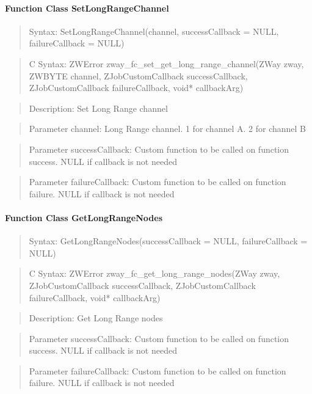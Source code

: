 \paragraph{Function Class SetLongRangeChannel}
\begin{quote}Syntax: SetLongRangeChannel(channel, successCallback = NULL, failureCallback = NULL)\end{quote}
\begin{quote}C Syntax: ZWError zway\_fc\_set\_get\_long\_range\_channel(ZWay zway, ZWBYTE channel, ZJobCustomCallback successCallback, ZJobCustomCallback failureCallback, void* callbackArg)\end{quote}
\begin{quote}Description: Set Long Range channel\end{quote}
\begin{quote}Parameter channel: Long Range channel. 1 for channel A. 2 for channel B\end{quote}
\begin{quote}Parameter successCallback: Custom function to be called on function success. NULL if callback is not needed\end{quote}
\begin{quote}Parameter failureCallback: Custom function to be called on function failure. NULL if callback is not needed\end{quote}


\paragraph{Function Class GetLongRangeNodes}
\begin{quote}Syntax: GetLongRangeNodes(successCallback = NULL, failureCallback = NULL)\end{quote}
\begin{quote}C Syntax: ZWError zway\_fc\_get\_long\_range\_nodes(ZWay zway, ZJobCustomCallback successCallback, ZJobCustomCallback failureCallback, void* callbackArg)\end{quote}
\begin{quote}Description: Get Long Range nodes\end{quote}
\begin{quote}Parameter successCallback: Custom function to be called on function success. NULL if callback is not needed\end{quote}
\begin{quote}Parameter failureCallback: Custom function to be called on function failure. NULL if callback is not needed\end{quote}

